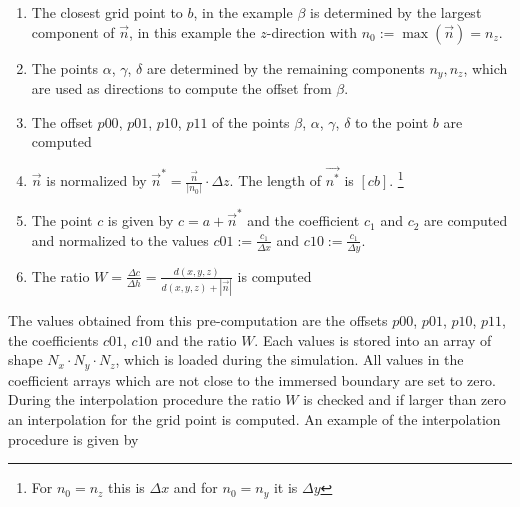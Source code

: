\begin{enumerate}
    \item The closest grid point to $b$, in the example  $\beta$ is determined by the largest component of $\vec{n}$, in this example
          the $z$-direction with $n_0 := \max(\vec{n}) = n_z$.

    \item The points $\alpha$, $\gamma$, $\delta$ are determined by the remaining components ${n_y, n_z}$, which are used as directions to
            compute the offset from $\beta$.

    \item The offset $p00$, $p01$, $p10$, $p11$ of the points $\beta$, $\alpha$, $\gamma$, $\delta$ to the point $b$ are computed

    \item $\vec{n}$ is normalized by $\vec{n}^* = \frac{\vec{n}}{|n_0|}\cdot \Delta z$. The length of $\vec{n^*}$ is $[cb]$.
            \footnote{For $n_0=n_z$ this is $\Delta x$ and for $n_0=n_y$ it is $\Delta y$}

    \item The point $c$ is given by $c = a + \vec{n}^*$ and the coefficient $c_1$ and $c_2$ are computed and normalized to the values
           $c01 := \frac{c_1}{\Delta x}$ and $c10 := \frac{c_1}{\Delta y}$.
    \item The ratio $W=\frac{\Delta c}{\Delta h} = \frac{d(x, y, z)}{d(x, y, z) + |\vec{n}| }$ is computed
\end{enumerate}

The values obtained from this pre-computation are the offsets  $p00$, $p01$, $p10$, $p11$, the coefficients $c01$, $c10$ and
the ratio $W$. Each values is stored into an array of shape $N_x \cdot N_y \cdot N_z$, which is loaded during the simulation.
All values in the coefficient arrays which are not close to the immersed boundary are set to zero.
During the interpolation procedure the ratio $W$ is checked and if larger than zero an interpolation for the grid point is computed.
An example of the interpolation procedure is given by

